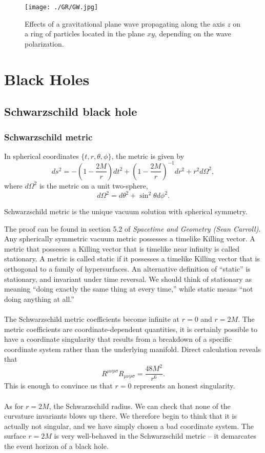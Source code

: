 \documentclass[cyan]{elegantnote}
\begin{document}
\begin{figure}[!h]
\centering
\texttt{[image: ./GR/GW.jpg]}
\caption{Effects of a gravitational plane wave propagating along the axis $z$ on a ring of particles located in the plane $xy$, depending on the wave polarization.}
\end{figure}

\chapter{Black Holes}
\section{Schwarzschild black hole}
\subsection{Schwarzschild metric}
In spherical coordinates $\{t,r,\theta,\phi\}$, the metric is given by
\[ds^2 = -\left(1 - \frac{2M}{r} \right)dt^2 + \left(1 - \frac{2M}{r} \right)^{-1}dr^2 + r^2 d\Omega^2,\]
where $d\Omega^2$ is the metric on a unit two-sphere,
\[d\Omega^2 = d\theta^2 + \sin^2\theta d\phi^2.\]

\begin{newthem}
Schwarzschild metric is the unique vacuum solution with spherical symmetry.
\end{newthem}
\noindent
The proof can be found in section 5.2 of \emph{Spacetime and Geometry (Sean Carroll)}. 
Any spherically symmetric vacuum metric possesses a timelike Killing vector. A metric that possesses a Killing vector that is timelike near infinity is called stationary. A metric is called static if it possesses a timelike Killing vector that is orthogonal to a family of hypersurfaces. 
An alternative definition of ``static'' is stationary, and invariant under time reversal. We should think of stationary as meaning ``doing exactly the same thing at every time,'' while static means ``not doing anything at all.''
\\ \\
The Schwarzschild metric coefficients become infinite at $r = 0$ and $r = 2M$. 
The metric coefficients are coordinate-dependent quantities, it is certainly possible to have a coordinate singularity that results from a breakdown of a specific coordinate system rather than the underlying manifold. 
Direct calculation reveals that
\[R^{\mu\nu\rho\sigma}R_{\mu\nu\rho\sigma} = \frac{48M^2}{r^6}.\]
This is enough to convince us that $r = 0$ represents an honest singularity.
\\ \\
As for $r = 2M$, the Schwarzschild radius. We can check that none of the curvature invariants blows up there. We therefore begin to think that it is actually not singular, and we have simply chosen a bad coordinate system. The surface $r = 2M$ is very well-behaved in the Schwarzschild metric -- it demarcates the event horizon of a black hole.
\end{document}
